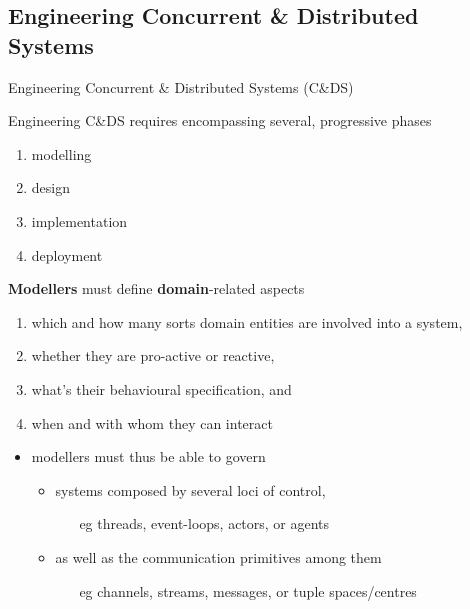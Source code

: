 \documentclass[presentation]{beamer}\mode<presentation>{\usetheme{AMSBolognaFC}}
\begin{document}
\subsection{Engineering Concurrent \& Distributed Systems}

\begin{frame}[c,allowframebreaks]{Engineering Concurrent \& Distributed Systems (C\&DS)}

    Engineering C\&DS requires encompassing several, progressive phases
    \begin{enumerate}
        \item modelling
        \item design
        \item implementation
        \item deployment
    \end{enumerate}

    \framebreak

    \begin{block}{\textbf{Modellers} must define \textbf{domain}-related aspects}
        \begin{enumerate}
            \item which and how many sorts \alert{domain entities} are involved into a system,
            \item whether they are \alert{pro-active} or \alert{reactive},
            \item what's their \alert{behavioural specification}, and
            \item when and with whom they can \alert{interact}
        \end{enumerate}
    \end{block}

    \bigskip

    \begin{itemize}
        \item modellers must thus be able to govern
        \begin{itemize}
            \item systems composed by several \alert{loci of control},
            \begin{itemize}
                \item[eg] threads, event-loops, actors, or \alert{agents}
            \end{itemize}

            \item as well as the \alert{communication primitives} among them
            \begin{itemize}
                \item[eg] channels, streams, messages, or tuple spaces/centres
            \end{itemize}
        \end{itemize}


\end{itemize}
\end{frame}
\end{document}
